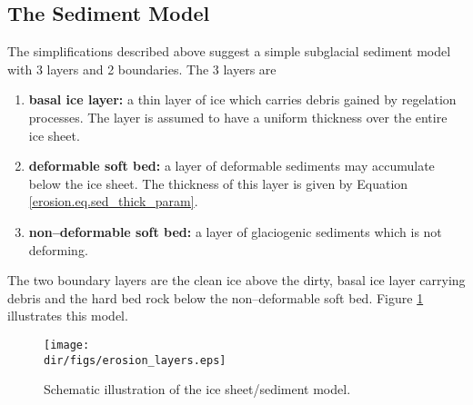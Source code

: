 \subsection{The Sediment Model}
The simplifications described above suggest a simple subglacial sediment model with 3 layers and 2 boundaries. The 3 layers are
\begin{enumerate}
\item \textbf{basal ice layer:} a thin layer of ice which carries debris gained
by regelation processes. The layer is assumed to have a uniform thickness over the entire ice sheet.
\item \textbf{deformable soft bed:} a layer of deformable sediments may accumulate below the ice sheet. The thickness of this layer is given by Equation \eqref{erosion.eq.sed_thick_param}.
\item \textbf{non--deformable soft bed:} a layer of glaciogenic sediments which is not deforming.
\end{enumerate}
The two boundary layers are the clean ice above the dirty, basal ice layer carrying debris and the hard bed rock below the non--deformable soft bed. Figure \ref{erosion.fig.ice_sed_model} illustrates this model.

\begin{figure}[htbp]
  \centering
  \texttt{[image: \\dir/figs/erosion\_layers.eps]}
  \caption{Schematic illustration of the ice sheet/sediment model.}
  \label{erosion.fig.ice_sed_model}
\end{figure}

